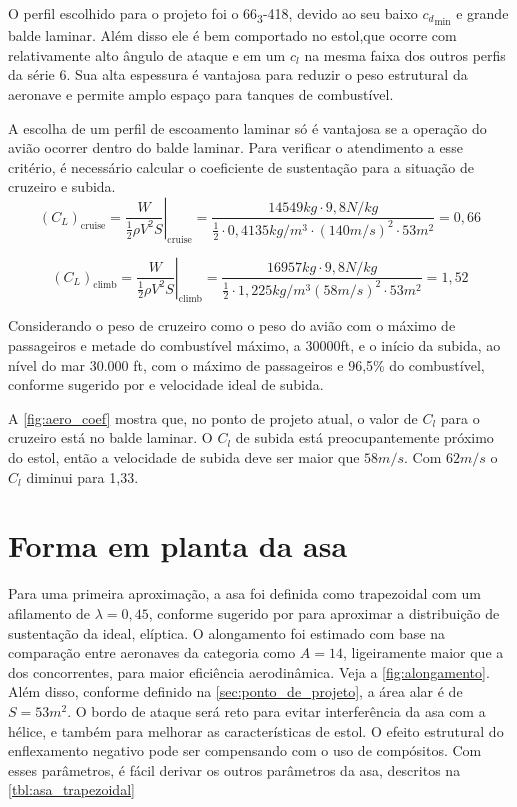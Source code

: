 O perfil escolhido para o projeto foi o 66\textsubscript{3}-418, devido ao seu baixo ${c_d}_{\min}$ e grande balde laminar. Além disso ele é bem comportado no estol,que ocorre com relativamente alto ângulo de ataque e em um $c_l$ na mesma faixa dos outros perfis da série 6. Sua alta espessura é vantajosa para reduzir o peso estrutural da aeronave e permite amplo espaço para tanques de combustível.

A escolha de um perfil de escoamento laminar só é vantajosa se a operação do avião ocorrer dentro do balde laminar. Para verificar o atendimento a esse critério, é necessário calcular o coeficiente de sustentação para a situação de cruzeiro e subida.
\begin{equation}
  (C_L)_{\text{cruise}} =
    \left.
      \frac {W} {\frac{1}{2} \rho V^2 S}
    \right|_{\text{cruise}} =
    \frac
      {14549\si{kg} \cdot 9,8\si{N/kg} }
      {\frac{1}{2} \cdot 0,4135 \si{kg/m^3} \cdot (140\si{m/s})^2 \cdot 53 \si{m^2}}
    = 0,66
\end{equation}

\begin{equation}
  (C_L)_{\text{climb}} =
    \left.\frac
      {W}
      {\frac{1}{2} \rho V^2 S}
    \right|_{\text{climb}} =
    \frac
      {16957\si{kg} \cdot 9,8\si{N/kg}}
      {\frac{1}{2} \cdot 1,225 \si{kg/m^3}
    (58\si{m/s})^2 \cdot 53 \si{m^2}}
    = 1,52
\end{equation}

Considerando o peso de cruzeiro como o peso do avião com o máximo de passageiros e metade do combustível máximo, a 30000ft, e o início da subida, ao nível do mar 30.000 \si{ft}, com o máximo de passageiros e 96,5\% do combustível, conforme sugerido por \cite{roskam} e velocidade ideal de subida.

A \autoref{fig:aero_coef} mostra que, no ponto de projeto atual, o valor de
$C_l$ para o cruzeiro está no balde laminar. O $C_l$ de subida está preocupantemente próximo do estol, então a velocidade de subida deve ser maior que $58\si{m/s}$. Com $62\si{m/s}$ o $C_l$ diminui para 1,33.

\section{Forma em planta da asa}
\label{formaemplanta_asa}

Para uma primeira aproximação, a asa foi definida como trapezoidal com um afilamento de $\lambda = 0,45$, conforme sugerido por \cite{raymer2012aircraft} para aproximar a distribuição de sustentação da ideal, elíptica. O alongamento foi estimado com base na comparação entre aeronaves da categoria como $A = 14$, ligeiramente maior que a dos concorrentes, para maior eficiência aerodinâmica. Veja a \autoref{fig:alongamento}. Além disso, conforme definido na \autoref{sec:ponto_de_projeto}, a área alar é de $S=53\si{m^2}$. O bordo de ataque será reto para evitar interferência da asa com a hélice, e também para melhorar as características de estol. O efeito estrutural do enflexamento negativo pode ser compensando com o uso de compósitos. Com esses parâmetros, é fácil derivar os outros parâmetros da asa, descritos na \autoref{tbl:asa_trapezoidal}

